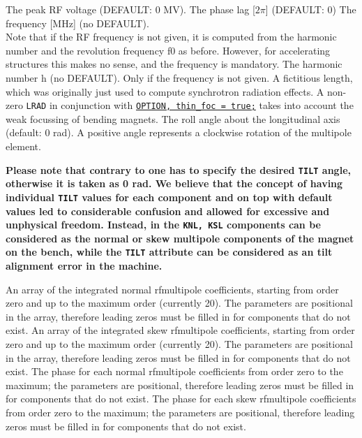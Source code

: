 \begin{madlist}
    The peak RF voltage (DEFAULT: 0 MV).  
    The phase lag [$2\pi$] (DEFAULT: 0) 
    The frequency [MHz] (no DEFAULT). \\ 
     Note that if the RF
     frequency is not given, it is computed from the harmonic
     number and the revolution frequency f0 as before. However, for
     accelerating structures this makes no sense, and the frequency
     is mandatory.  
    The harmonic number h (no DEFAULT). Only if the
     frequency is not given. 
    A fictitious length, which was originally just used to
     compute synchrotron radiation effects. A non-zero \texttt{LRAD} in
     conjunction with \hyperref[sec:option]{\texttt{OPTION, thin\_foc =
     true;}} takes into account the weak focussing of bending magnets.  
    The roll angle about the longitudinal axis (default: 0
     rad). A positive angle represents a clockwise rotation of the
     multipole element.            

     \textbf{Please note that contrary to \madeight one has to specify the
       desired \texttt{TILT} angle, otherwise it is taken as 0 rad. We
       believe that the \madeight concept of having individual
       \texttt{TILT} values for each component and on top with default
       values led to considerable confusion and allowed for excessive
       and unphysical freedom. Instead, in \madx the \texttt{KNL, KSL}
       components can be considered as the normal or skew
       multipole components of the magnet on the bench, while the
       \texttt{TILT} attribute can be considered as an tilt alignment
       error in the machine.} 

    An array of the integrated normal rfmultipole
     coefficients, starting from order zero and up to the maximum
     order (currently 20). 
     The parameters are positional in the array, therefore leading 
     zeros must be filled in for components that do not exist. 
    An array of the integrated skew rfmultipole
     coefficients, starting from order zero and up to the maximum
     order (currently 20). 
     The parameters are positional in the array, therefore leading 
     zeros must be filled in for components that do not exist. 
    The phase for each normal rfmultipole coefficients from
     order zero to the maximum; the parameters are positional,
     therefore leading zeros must be filled in for components that do not
     exist.  
    The phase for each skew rfmultipole coefficients from
     order zero to the maximum; the parameters are positional,
     therefore leading zeros must be filled in for components that do not
     exist.  
\end{madlist}


